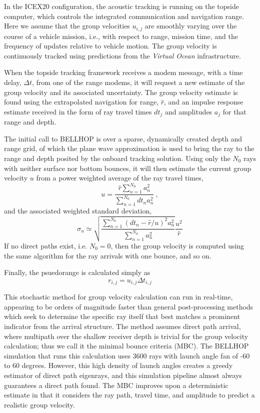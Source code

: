 In the ICEX20 configuration, the acoustic tracking is running on the topside computer, which controls the integrated communication and navigation range.
Here we assume that the group velocities $u_{i,j}$ are smoothly varying over the course of a vehicle mission, i.e., with respect to range, mission time, and the frequency of updates relative to vehicle motion. 
The group velocity is continuously tracked using predictions from the \textit{Virtual Ocean} infrastructure.

When the topside tracking framework receives a modem message, with a time delay, $\Delta t$, from one of the range modems, it will request a new estimate of the group velocity and its associated uncertainty.
The group velocity estimate is found using the extrapolated navigation for range, $\hat{r}$, and an impulse response estimate received in the form of ray travel times $dt_{j}$ and amplitudes $a_{j}$ for that range and depth.

The initial call to BELLHOP is over a sparse, dynamically created depth and range grid, of which the plane wave approximation is used to bring the ray to the range and depth posited by the onboard tracking solution.
Using only the $N_0$ rays with neither surface nor bottom bounces, it will then estimate the current group velocity $u$ from a power weighted average of the ray travel times,
\begin{equation}
u = \frac{\hat{r} \sum_{n=1}^{N_{0}} a_{n}^{2}}{\sum_{n=1}^{N_{0}} dt_{n}a_{n}^{2}} ~, 
\end{equation}
and the associated weighted standard deviation,
\begin{equation}
\sigma_{u} \simeq \sqrt{\frac {\sum_{n=1}^{N_{0}} (dt_{n}-\hat{r}/u)^{2}a_{n}^{2}}{ \sum_{n=1}^{N_{0}} a_{n}^{2}} } \frac{u^{2}}{\hat{r}}
\end{equation}
If no direct paths exist, i.e. $N_{0}=0$, then the group velocity is computed using the same algorithm for the ray arrivals with one bounce, and so on.

Finally, the psuedorange is calculated simply as
\begin{equation}
r_{i,j} = u_{i,j} \Delta t_{i,j} 
\end{equation}

This stochastic method for group velocity calculation can run in real-time, appearing to be orders of magnitude faster than general post-processing methods which seek to determine the specific ray itself that best matches a prominent indicator from the arrival structure.
The method assumes direct path arrival, where multipath over the shallow receiver depth is trivial for the group velocity calculation; thus we call it the minimal bounce criteria (MBC).
The BELLHOP simulation that runs this calculation uses 3600 rays with launch angle fan of -60 to 60 degrees.
However, this high density of launch angles creates a greedy estimator of direct path eigenrays, and this simulation pipeline almost always guarantees a direct path found.
The MBC improves upon a deterministic estimate in that it considers the ray path, travel time, and amplitude to predict a realistic group velocity.


